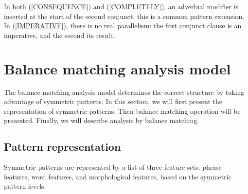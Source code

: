 In both (\ref{CONSEQUENCE}) and (\ref{COMPLETELY}), an adverbial
modifier is inserted at the start of the second conjunct; this is a
common pattern extension. In (\ref{IMPERATIVE}), there is no real
parallelism: the first conjunct clause is an imperative, and the
second its result. 


\section{Balance matching analysis model}

The balance matching analysis model determines the correct structure
by taking advantage of symmetric patterns.  In this section, we will first
present the representation of symmetric patterns.
Then balance matching operation will be presented.  Finally, we will describe
analysis by balance matching.


\subsection{Pattern representation}

Symmetric patterns are represented by a list of three feature
sets; phrase features, word features, and morphological features,
based on the symmetric pattern levels.

